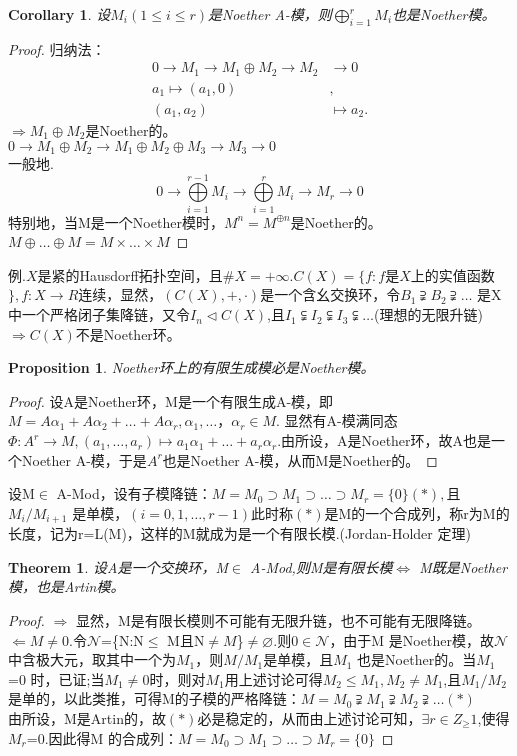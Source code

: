 \documentclass[UTF8]{article}
\newtheorem{thm}{Theorem}
\newtheorem{cor}{Corollary}
\newtheorem{prop}{Proposition}
\begin{document}
\begin{cor}
	设$M_i(1\leq i\leq r)$是Noether A-模，则$\bigoplus\limits_{i=1}^r{M_i}$也是Noether模。
\end{cor}
\begin{proof}
	归纳法：
	\[
	\begin{split}
	0\longrightarrow M_1\longrightarrow M_1\oplus M_2\longrightarrow M_{2}&\longrightarrow0\\
	a_1\longmapsto(a_1,0)&,\\
	(a_1,a_2)&\longmapsto a_2.
	\end{split}
	\]
	$\Rightarrow M_1\oplus M_2$是Noether的。\\
	$0\longrightarrow M_1\oplus M_2\longrightarrow M_1\oplus M_2\oplus M_3\longrightarrow M_3\longrightarrow0$\\
	一般地.
	$$0\longrightarrow\bigoplus\limits_{i=1}^{r-1}M_i\longrightarrow\bigoplus\limits_{i=1}^r{M_i}\longrightarrow M_r\longrightarrow0$$
	特别地，当M是一个Noether模时，$M^n=M^{\oplus n}$是Noether的。\\
	$M\oplus\ldots\oplus M=M\times\ldots\times M$
\end{proof}
例.$X$是紧的Hausdorff拓扑空间，且$\#X=+\infty.C(X)=\{f:f$是$X$上的实值函数$\},f:X\longrightarrow R$连续，显然，$(C(X),+,\cdot)$是一个含幺交换环，令$B_1\supsetneqq B_2\supsetneqq\ldots$ 是X中一个严格闭子集降链，又令$I_n\vartriangleleft C(X)$,且$I_1\subsetneqq I_2\subsetneqq I_3\subsetneqq\ldots$(理想的无限升链)$\Rightarrow C(X)$不是Noether环。\\
\begin{prop}
	Noether环上的有限生成模必是Noether模。
\end{prop}
\begin{proof}
	设A是Noether环，M是一个有限生成A-模，即$M=A\alpha_1+A\alpha_2+\ldots+A\alpha_r,\alpha_1,\ldots ，\alpha_r\in M.$
	显然有A-模满同态$\Phi:A^r\longrightarrow M,(a_1,\ldots,a_r)\longmapsto a_1\alpha_1+\ldots+a_r\alpha_r.$由所设，A是Noether环，故A也是一个Noether A-模，于是$A^r$也是Noether A-模，从而M是Noether的。
\end{proof}
设M$\in$ A-Mod，设有子模降链：$M=M_0\supset M_1\supset\ldots\supset M_r=\{0\}(\ast),$且$M_i/M_{i+1}$ 是单模，$(i=0,1,\ldots,r-1)$此时称$(\ast)$是M的一个合成列，称r为M的长度，记为r=L(M)，这样的M就成为是一个有限长模.(Jordan-Holder 定理)\\
\begin{thm}
	设A是一个交换环，M$\in$ A-Mod,则M是有限长模$\Leftrightarrow$ M既是Noether模，也是Artin模。
\end{thm}
\begin{proof}
	$\Rightarrow$ 显然，M是有限长模则不可能有无限升链，也不可能有无限降链。
	$\Leftarrow M\neq0$.令$\mathscr{N}$=\{N:N$\leq$ M且N$\neq M$\}$\neq\varnothing$.则$0\in\mathscr{N}$，由于M 是Noether模，故$\mathscr{N}$中含极大元，取其中一个为$M_1$，则$M/M_1$是单模，且$M_1$ 也是Noether的。当$M_1$=0 时，已证;当$M_1\neq0$时，则对$M_1$用上述讨论可得$M_2\leq M_1,M_2\neq M_1$,且$M_1/M_2$是单的，以此类推，可得M的子模的严格降链：$M=M_0\supsetneqq M_1\supsetneqq M_2\supsetneqq\ldots(\ast)$\\
	由所设，M是Artin的，故$(\ast)$必是稳定的，从而由上述讨论可知，$\exists r\in Z_\geq1$,使得$M_r$=0.因此得M 的合成列：$M=M_0\supset M_1\supset\ldots\supset M_r=\{0\}$
\end{proof}
\end{document}
